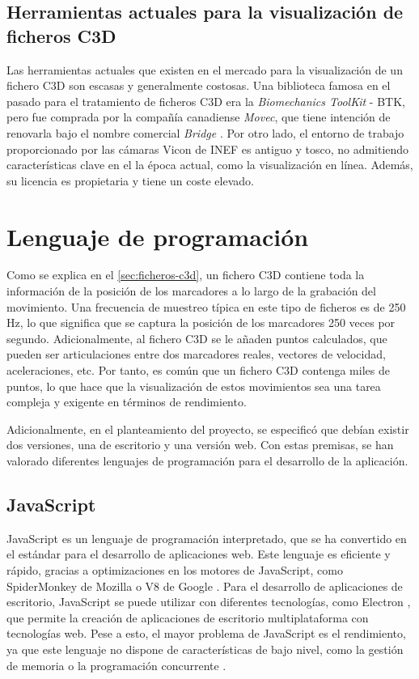 \subsection{Herramientas actuales para la visualización de ficheros \acs{C3D}}

Las herramientas actuales que existen en el mercado para la visualización de un fichero \ac{C3D} son escasas y generalmente costosas. Una biblioteca famosa en el pasado para el tratamiento de ficheros \ac{C3D} era la \textit{Biomechanics ToolKit} - BTK, pero fue comprada por la compañía canadiense \textit{Movec}, que tiene intención de renovarla bajo el nombre comercial \textit{Bridge} \autocite{Bridge,ProjectBiomechanicalToolKit}. Por otro lado, el entorno de trabajo proporcionado por las cámaras Vicon de \ac{INEF} es antiguo y tosco, no admitiendo características clave en el la época actual, como la visualización en línea. Además, su licencia es propietaria y tiene un coste elevado.


\section{Lenguaje de programación}

Como se explica en el \autoref{sec:ficheros-c3d}, un fichero \ac{C3D} contiene toda la información de la posición de los marcadores a lo largo de la grabación del movimiento. Una frecuencia de muestreo típica en este tipo de ficheros es de 250 Hz, lo que significa que se captura la posición de los marcadores 250 veces por segundo. Adicionalmente, al fichero \ac{C3D} se le añaden puntos calculados, que pueden ser articulaciones entre dos marcadores reales, vectores de velocidad, aceleraciones, etc. Por tanto, es común que un fichero \ac{C3D} contenga miles de puntos, lo que hace que la visualización de estos movimientos sea una tarea compleja y exigente en términos de rendimiento.  

Adicionalmente, en el planteamiento del proyecto, se especificó que debían existir dos versiones, una de escritorio y una versión web. Con estas premisas, se han valorado diferentes lenguajes de programación para el desarrollo de la aplicación.  

\subsection{JavaScript}
JavaScript es un lenguaje de programación interpretado, que se ha convertido en el estándar para el desarrollo de aplicaciones web. Este lenguaje es eficiente y rápido, gracias a optimizaciones en los motores de JavaScript, como SpiderMonkey de Mozilla o V8 de Google \autocite{srinetChromeV8Firefox2022}. Para el desarrollo de aplicaciones de escritorio, JavaScript se puede utilizar con diferentes tecnologías, como Electron \autocite{BuildCrossplatformDesktop}, que permite la creación de aplicaciones de escritorio multiplataforma con tecnologías web. Pese a esto, el mayor problema de JavaScript es el rendimiento, ya que este lenguaje no dispone de características de bajo nivel, como la gestión de memoria o la programación concurrente \autocite{MemoryManagementJavaScript2025,pengMultithreadingJavascript2017}.

